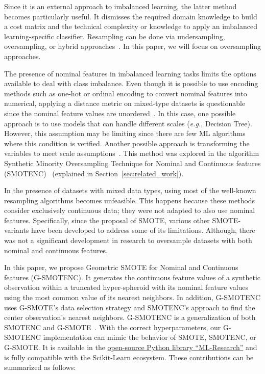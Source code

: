 \documentclass[preprint,12pt]{elsarticle}
\begin{document}
{Since it is an external approach to imbalanced learning, the latter method
becomes particularly useful. It dismisses the required domain knowledge to
build a cost matrix and the technical complexity or knowledge to apply an
imbalanced learning-specific classifier. Resampling can be done via
undersampling, oversampling, or hybrid approaches~\cite{tarekegn2021review}. In
this paper, we will focus on oversampling approaches.

The presence of nominal features in imbalanced learning tasks limits the
options available to deal with class imbalance. Even though it is possible to
use encoding methods such as one-hot or ordinal encoding to convert nominal
features into numerical, applying a distance metric on mixed-type datasets is
questionable since the nominal feature values are
unordered~\cite{lumijarvi2004comparison}. In this case, one possible approach
is to use models that can handle different scales (\textit{e.g.}, Decision
Tree). However, this assumption may be limiting since there are few ML
algorithms where this condition is verified. Another possible approach is
transforming the variables to meet scale
assumptions~\cite{lumijarvi2004comparison}. This method was explored in the
algorithm Synthetic Minority Oversampling Technique for Nominal and Continuous
features (SMOTENC)~\cite{Chawla2002} (explained in
Section~\ref{sec:related_work}).

In the presence of datasets with mixed data types, using most of the
well-known resampling algorithms becomes unfeasible. This happens because
these methods consider exclusively continuous data; they were not adapted to
also use nominal features. Specifically, since the proposal of SMOTE, various
other SMOTE-variants have been developed to address some of its limitations.
Although, there was not a significant development in research to oversample
datasets with both nominal and continuous features. 

In this paper, we propose Geometric SMOTE for Nominal and Continuous features
(G-SMOTENC). It generates the continuous feature values of a synthetic
observation within a truncated hyper-spheroid with its nominal feature values
using the most common value of its nearest neighbors. In addition, G-SMOTENC
uses G-SMOTE's data selection strategy and SMOTENC's approach to find the
center observation's nearest neighbors. G-SMOTENC is a generalization of both
SMOTENC and G-SMOTE~\cite{douzas2019geometric}. With the correct
hyperparameters, our G-SMOTENC implementation can mimic the behavior of SMOTE,
SMOTENC, or G-SMOTE\@. It is available in the
\href{https://github.com/joaopfonseca/ml-research}{open-source Python library
``ML-Research''} and is fully compatible with the Scikit-Learn ecosystem.
These contributions can be summarized as follows:

}
\end{document}
